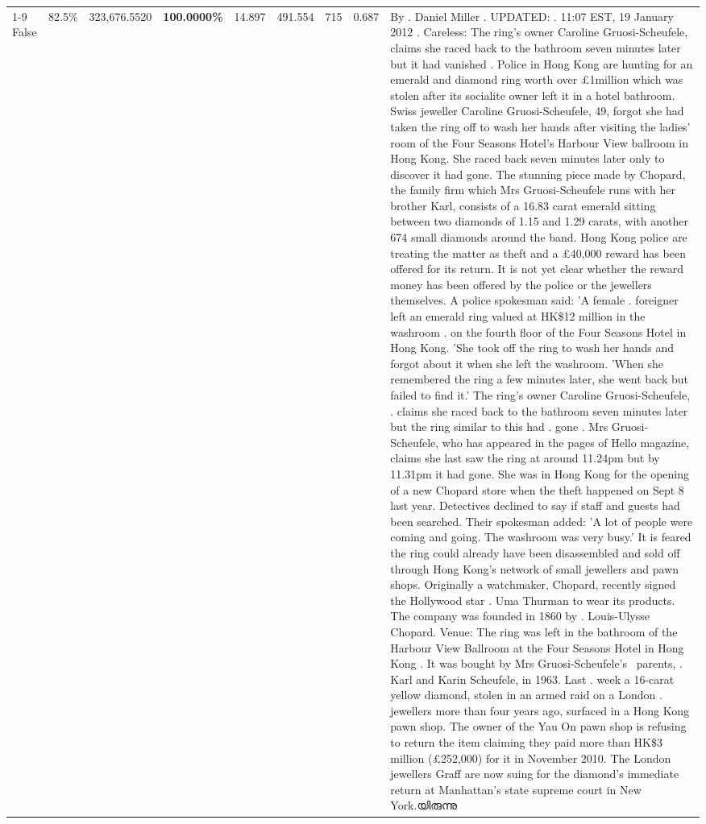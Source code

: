 \begin{table}[H]
\begin{tabular}{lllrlllll}
\cline{1-9}
False & 82.5\% & 323,676.5520 & \bfseries \color{red} 100.0000\% & 14.897 & 491.554 & 715 & 0.687 & By . Daniel Miller . UPDATED: . 11:07 EST, 19 January 2012 . Careless: The ring's owner Caroline Gruosi-Scheufele, claims she raced back to the bathroom seven minutes later but it had vanished . Police in Hong Kong are hunting for an emerald and diamond ring worth over £1million which was stolen after its socialite owner left it in a hotel bathroom. Swiss jeweller Caroline Gruosi-Scheufele, 49, forgot she had taken the ring off to wash her hands after visiting the ladies' room of the Four Seasons Hotel's Harbour View ballroom in Hong Kong. She raced back seven minutes later only to discover it had gone. The stunning piece made by Chopard, the family firm which Mrs Gruosi-Scheufele runs with her brother Karl, consists of a 16.83 carat emerald sitting between two diamonds of 1.15 and 1.29 carats, with another 674 small diamonds around the band. Hong Kong police are treating the matter as theft and a £40,000 reward has been offered for its return. It is not yet clear whether the reward money has been offered by the police or the jewellers themselves. A police spokesman said: 'A female . foreigner left an emerald ring valued at HK\$12 million in the washroom . on the fourth floor of the Four Seasons Hotel in Hong Kong. 'She took off the ring to wash her hands and forgot about it when she left the washroom. 'When she remembered the ring a few minutes later, she went back but failed to find it.' The ring's owner Caroline Gruosi-Scheufele, . claims she raced back to the bathroom seven minutes later but the ring similar to this had . gone . Mrs Gruosi-Scheufele, who has appeared in the pages of Hello magazine, claims she last saw the ring at around 11.24pm but by 11.31pm it had gone. She was in Hong Kong for the opening of a new Chopard store when the theft happened on Sept 8 last year. Detectives declined to say if staff and guests had been searched. Their spokesman added: 'A lot of people were coming and going. The washroom was very busy.' It is feared the ring could already have been disassembled and sold off through Hong Kong's network of small jewellers and pawn shops. Originally a watchmaker, Chopard, recently signed the Hollywood star . Uma Thurman to wear its products. The company was founded in 1860 by . Louis-Ulysse Chopard. Venue: The ring was left in the bathroom of the Harbour View Ballroom at the Four Seasons Hotel in Hong Kong . It was bought by Mrs Gruosi-Scheufele's  parents, . Karl and Karin Scheufele, in 1963. Last . week a 16-carat yellow diamond, stolen in an armed raid on a London . jewellers more than four years ago, surfaced in a Hong Kong pawn shop. The owner of the Yau On pawn shop is refusing to return the item claiming they paid more than HK\$3 million (£252,000) for it in November 2010. The London jewellers Graff are now suing for the diamond’s immediate return at Manhattan’s state supreme court in New York.യിരുന്നു \\

\end{tabular}
\end{table}

